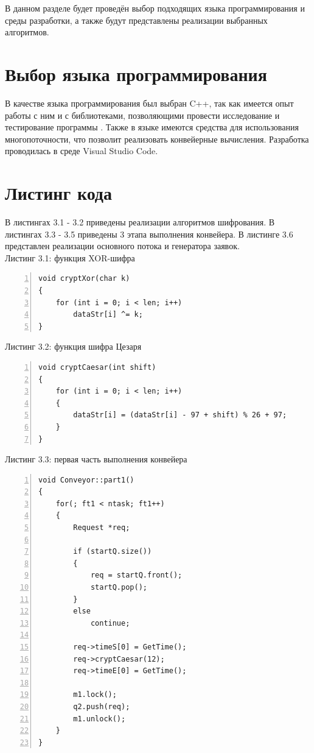 \documentclass[12pt,a4paper]{report}
\begin{document}
В данном разделе будет проведён выбор подходящих языка программирования и среды разработки, а также 
будут представлены реализации выбранных алгоритмов.

\section{Выбор языка программирования}

В качестве языка программирования был выбран C++, так как имеется опыт работы с ним и с библиотеками, 
позволяющими провести исследование и тестирование программы \cite{cpp_info}. 
Также в языке имеются средства для использования многопоточности, что позволит реализовать 
конвейерные вычисления. 
Разработка проводилась в среде Visual Studio Code.

\section{Листинг кода}

В листингах 3.1 - 3.2 приведены реализации алгоритмов шифрования.
В листингах 3.3 - 3.5 приведены 3 этапа выполнения конвейера. 
В листинге 3.6 представлен реализации основного потока и генератора заявок.\\

\textrm{Листинг 3.1: функция XOR-шифра}
\begin{lstlisting}[frame=single, numbers=left]
void cryptXor(char k)
{
    for (int i = 0; i < len; i++)
        dataStr[i] ^= k;
}
\end{lstlisting}

\textrm{Листинг 3.2: функция шифра Цезаря}
\begin{lstlisting}[frame=single, numbers=left]
void cryptCaesar(int shift)
{
    for (int i = 0; i < len; i++)
    {
        dataStr[i] = (dataStr[i] - 97 + shift) % 26 + 97;
    }
}
\end{lstlisting}

\newpage
\textrm{Листинг 3.3: первая часть выполнения конвейера}
\begin{lstlisting}[frame=single, numbers=left]
void Conveyor::part1()
{
    for(; ft1 < ntask; ft1++)
    {
        Request *req;
    
        if (startQ.size())
        {
            req = startQ.front();
            startQ.pop();
        }
        else
            continue;
    
        req->timeS[0] = GetTime();
        req->cryptCaesar(12);
        req->timeE[0] = GetTime();
    
        m1.lock();
        q2.push(req);
        m1.unlock();
    }
}
\end{lstlisting}
\end{document}
